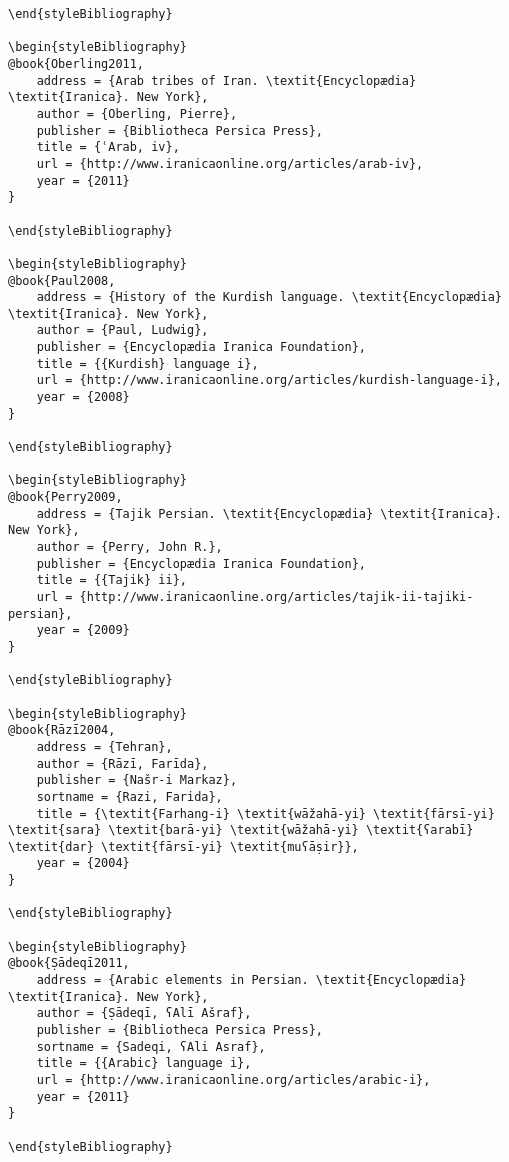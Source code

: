 \documentclass[output=paper]{langsci/langscibook}
\begin{document}
\begin{verbatim}
\end{styleBibliography}

\begin{styleBibliography}
@book{Oberling2011,
	address = {Arab tribes of Iran. \textit{Encyclopædia} \textit{Iranica}. New York},
	author = {Oberling, Pierre},
	publisher = {Bibliotheca Persica Press},
	title = {ʿArab, iv},
	url = {http://www.iranicaonline.org/articles/arab-iv},
	year = {2011}
}

\end{styleBibliography}

\begin{styleBibliography}
@book{Paul2008,
	address = {History of the Kurdish language. \textit{Encyclopædia} \textit{Iranica}. New York},
	author = {Paul, Ludwig},
	publisher = {Encyclopædia Iranica Foundation},
	title = {{Kurdish} language i},
	url = {http://www.iranicaonline.org/articles/kurdish-language-i},
	year = {2008}
}

\end{styleBibliography}

\begin{styleBibliography}
@book{Perry2009,
	address = {Tajik Persian. \textit{Encyclopædia} \textit{Iranica}. New York},
	author = {Perry, John R.},
	publisher = {Encyclopædia Iranica Foundation},
	title = {{Tajik} ii},
	url = {http://www.iranicaonline.org/articles/tajik-ii-tajiki-persian},
	year = {2009}
}

\end{styleBibliography}

\begin{styleBibliography}
@book{Rāzī2004,
	address = {Tehran},
	author = {Rāzī, Farīda},
	publisher = {Našr-i Markaz},
	sortname = {Razi, Farida},
	title = {\textit{Farhang-i} \textit{wāžahā-yi} \textit{fārsī-yi} \textit{sara} \textit{barā-yi} \textit{wāžahā-yi} \textit{ʕarabī} \textit{dar} \textit{fārsī-yi} \textit{muʕāṣir}},
	year = {2004}
}

\end{styleBibliography}

\begin{styleBibliography}
@book{Ṣādeqī2011,
	address = {Arabic elements in Persian. \textit{Encyclopædia} \textit{Iranica}. New York},
	author = {Ṣādeqī, ʕAlī Ašraf},
	publisher = {Bibliotheca Persica Press},
	sortname = {Sadeqi, ʕAli Asraf},
	title = {{Arabic} language i},
	url = {http://www.iranicaonline.org/articles/arabic-i},
	year = {2011}
}

\end{styleBibliography}


\end{verbatim}
\end{document}
